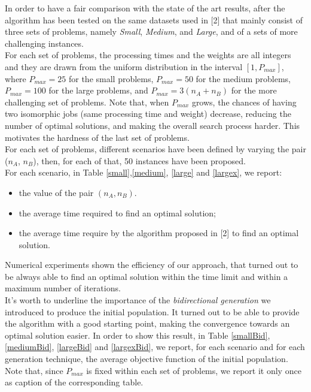 \documentclass[opre,nonblindrev]{informs3} %
\begin{document}
In order to have a fair comparison with the state of the art results, after the algorithm has been tested on the same datasets used in [2] that mainly consist of three sets of problems, namely \textit{Small}, \textit{Medium}, and \textit{Large}, and of a sets of more challenging instances.\\ For each set of problems, the processing times and the weights are all integers and they are drawn from the uniform distribution in the interval $[1,P_{max}]$, where $P_{max} = 25$ for the small problems, $P_{max}=50$ for the medium problems, $P_{max}=100$ for the large problems, and $P_{max} = 3(n_A+n_B)$ for the more challenging set of problems. Note that, when $P_{max}$ grows, the chances of having two isomorphic jobs (same processing time and weight) decrease, reducing the number of optimal solutions, and making the overall search process harder. This motivates the hardness of the last set of problems.\\    
For each set of problems, different scenarios have been defined by varying the pair ($n_A$, $n_B$), then, for each of that, 50 instances have been proposed.\\ 
For each scenario, in Table \ref{small},\ref{medium}, \ref{large} and \ref{largex}, we report:
\begin{itemize}
\item the value of the pair $(n_A,n_B)$.
\item the average time required to find an optimal solution;
\item the average time require by the algorithm proposed in [2] to find an optimal solution.
\end{itemize}
Numerical experiments shown the efficiency of our approach, that turned out to be always able to find an optimal solution within the time limit and within a maximum number of iterations.\\
It's worth to underline the importance of the \textit{bidirectional generation} we introduced to produce the initial population. It turned out to be able to provide the algorithm with a good starting point, making the convergence towards an optimal solution easier. In order to show this result, in Table \ref{smallBid},\ref{mediumBid}, \ref{largeBid} and \ref{largexBid}, we report, for each scenario and for each generation technique, the average objective function of the initial population.\\
Note that, since $P_{max}$ is fixed within each set of problems, we report it only once as caption of the corresponding table.
\end{document}
